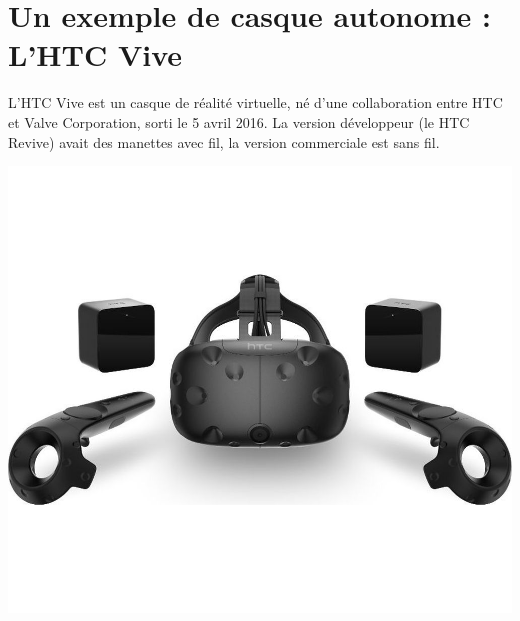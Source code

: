 \documentclass[12pt, a4paper]{report}
\begin{document}
\section{Un exemple de casque autonome : L'HTC Vive}

L'HTC Vive est un casque de réalité virtuelle, né d'une collaboration entre HTC et Valve Corporation, sorti le 5 avril 2016.
La version développeur (le HTC Revive) avait des manettes avec fil, la version commerciale est sans fil.

\begin{center}
\includegraphics[scale=0.2]{htc.jpg}
\end{center}
\end{document}
